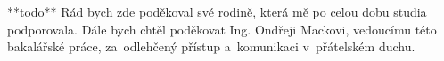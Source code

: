 \documentclass[11pt,twoside,a4paper]{book}
\begin{document}
	
	\translate				%

	


	\coverpagestarts


	\acknowledgements
	\noindent
	**todo**
	Rád bych zde poděkoval své rodině, která mě po celou dobu studia podporovala. Dále bych chtěl poděkovat Ing. Ondřeji Mackovi, vedoucímu této bakalářské práce, za~odlehčený přístup a~komunikaci v~přátelském duchu.





 
\end{document}
